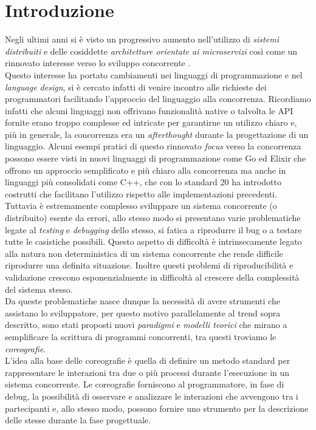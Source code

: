 \chapter{Introduzione}
Negli ultimi anni si è visto un progressivo aumento nell'utilizzo di \emph{sistemi distribuiti} e delle cosiddette \emph{architetture orientate ai microservizi} \cite{MicroservicesFocus} così come un rinnovato interesse verso lo sviluppo concorrente \cite{ConcurrencyFocus}.\\
Questo interesse ha portato cambiamenti nei linguaggi di programmazione e nel \emph{language design}, si è cercato infatti di venire incontro alle richieste dei programmatori facilitando l'approccio del linguaggio alla concorrenza. Ricordiamo infatti che alcuni linguaggi non offrivano funzionalità native o talvolta le API fornite erano troppo complesse ed intricate per garantirne un utilizzo chiaro e, più in generale, la concorrenza era un \emph{afterthought} durante la progettazione di un linguaggio. Alcuni esempi pratici di questo rinnovato \emph{focus} verso la concorrenza possono essere visti in nuovi linguaggi di programmazione come Go\cite{Golang} ed Elixir\cite{Elixir} che offrono un approccio semplificato e più chiaro alla concorrenza ma anche in linguaggi più consolidati come C++\cite{C_Plus_Plus}, che con lo standard 20 ha introdotto costrutti che facilitano l'utilizzo rispetto alle implementazioni precedenti.\bigskip \\
Tuttavia è estremamente complesso sviluppare un sistema concorrente (o distribuito) esente da errori, allo stesso modo si presentano varie problematiche legate al \emph{testing} e \emph{debugging} dello stesso, si fatica a riprodurre il bug o a testare tutte le casistiche possibili. Questo aspetto di difficoltà è intrinsecamente legato alla natura non deterministica di un sistema concorrente che rende difficile riprodurre una definita situazione. Inoltre questi problemi di riproducibilità e validazione crescono esponenzialmente in difficoltà al crescere della complessità del sistema stesso.\bigskip \\
Da queste problematiche nasce dunque la necessità di avere strumenti che assistano lo sviluppatore, per questo motivo parallelamente al trend sopra descritto, sono stati proposti nuovi \emph{paradigmi} e \emph{modelli teorici} che mirano a semplificare la scrittura di programmi concorrenti, tra questi troviamo le \emph{coreografie}\cite{Choreographies}.\\
L'idea alla base delle coreografie è quella di definire un metodo standard per rappresentare le interazioni tra due o più processi durante l'esecuzione in un sistema concorrente. Le coreografie forniscono al programmatore, in fase di debug, la possibilità di osservare e analizzare le interazioni che avvengono tra i partecipanti e, allo stesso modo, possono fornire uno strumento per la descrizione delle stesse durante la fase progettuale.\bigskip \\
